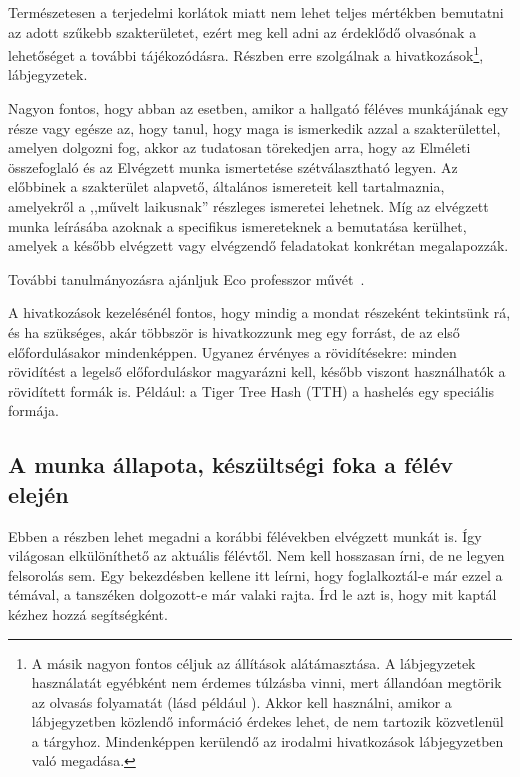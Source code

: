 \documentclass[a4paper,oneside]{article}
\begin{document}
Természetesen a terjedelmi korlátok miatt nem lehet teljes mértékben
bemutatni az adott szűkebb szakterületet, ezért meg kell adni az
érdeklődő olvasónak a lehetőséget a további tájékozódásra.  Részben
erre szolgálnak a hivatkozások\footnote{A másik nagyon fontos céljuk
  az állítások alátámasztása.  A lábjegyzetek használatát egyébként
  nem érdemes túlzásba vinni, mert állandóan megtörik az olvasás
  folyamatát (lásd például \cite{esterhazy}).  Akkor kell használni,
  amikor a lábjegyzetben közlendő információ érdekes lehet, de nem
  tartozik közvetlenül a tárgyhoz.  Mindenképpen kerülendő az irodalmi
  hivatkozások lábjegyzetben való megadása.}, lábjegyzetek.

Nagyon fontos, hogy abban az esetben, amikor a hallgató féléves
munkájának egy része vagy egésze az, hogy tanul, hogy maga is
ismerkedik azzal a szakterülettel, amelyen dolgozni fog, akkor az
tudatosan törekedjen arra, hogy az Elméleti összefoglaló és az
Elvégzett munka ismertetése szétválasztható legyen.  Az előbbinek a
szakterület alapvető, általános ismereteit kell tartalmaznia,
amelyekről a ,,művelt laikusnak'' részleges ismeretei lehetnek.  Míg
az elvégzett munka leírásába azoknak a specifikus ismereteknek a
bemutatása kerülhet, amelyek a később elvégzett vagy elvégzendő
feladatokat konkrétan megalapozzák.

További tanulmányozásra ajánljuk Eco professzor művét~\cite{eco}.

A hivatkozások kezelésénél fontos, hogy mindig a mondat részeként
tekintsünk rá, és ha szükséges, akár többször is hivatkozzunk meg egy
forrást, de az első előfordulásakor mindenképpen.  Ugyanez érvényes a
rövidítésekre: minden rövidítést a legelső előforduláskor magyarázni
kell, később viszont használhatók a rövidített formák is.  Például: a
Tiger Tree Hash (TTH) a hashelés egy speciális formája.

\subsection{A munka állapota, készültségi foka a félév elején}
\label{sec:munka-allap-kesz}

Ebben a részben lehet megadni a korábbi félévekben elvégzett munkát
is.  Így világosan elkülöníthető az aktuális félévtől.  Nem kell
hosszasan írni, de ne legyen felsorolás sem.  Egy bekezdésben kellene
itt leírni, hogy foglalkoztál-e már ezzel a témával, a tanszéken
dolgozott-e már valaki rajta.  Írd le azt is, hogy mit kaptál kézhez
hozzá segítségként.
\end{document}

